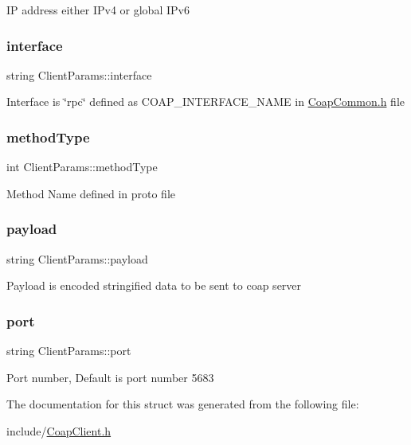 IP address either I\+Pv4 or global I\+Pv6 \mbox{\label{structClientParams_a6af6f3817ebf9ed3f7d9378e6a23a59e}} 
\subsubsection{\texorpdfstring{interface}{interface}}
{\footnotesize\ttfamily string Client\+Params\+::interface}

Interface is \char`\"{}rpc\char`\"{} defined as C\+O\+A\+P\+\_\+\+I\+N\+T\+E\+R\+F\+A\+C\+E\+\_\+\+N\+A\+ME in \hyperlink{CoapCommon_8h}{Coap\+Common.\+h} file \mbox{\label{structClientParams_aa40f37f1eeb3ed6cff8a76e92a7e9bd1}} 
\subsubsection{\texorpdfstring{method\+Type}{methodType}}
{\footnotesize\ttfamily int Client\+Params\+::method\+Type}

Method Name defined in proto file \mbox{\label{structClientParams_aa16d76f3cbdfa5bfd4e54bcdb9a25737}} 
\subsubsection{\texorpdfstring{payload}{payload}}
{\footnotesize\ttfamily string Client\+Params\+::payload}

Payload is encoded stringified data to be sent to coap server \mbox{\label{structClientParams_ade2b9a6084d6b1989c3440fe2cd60fdb}} 
\subsubsection{\texorpdfstring{port}{port}}
{\footnotesize\ttfamily string Client\+Params\+::port}

Port number, Default is port number 5683 

The documentation for this struct was generated from the following file\+:\begin{DoxyCompactItemize}
\item 
include/\hyperlink{CoapClient_8h}{Coap\+Client.\+h}\end{DoxyCompactItemize}
